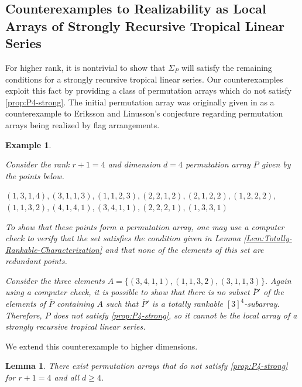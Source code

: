 \documentclass{amsart}
\newtheorem{lemma}[theorem]{Lemma}
\newtheorem{varexample}[theorem]{Example}
\newenvironment{example}{\begin{varexample}
		\begin{normalfont}}{\end{normalfont}
\end{varexample}}
\begin{document}
	\subsection{Counterexamples to Realizability as Local Arrays of Strongly Recursive Tropical Linear Series}
	\label{Subsec:counterexample-to-SRTLS-realizability}
	
	For higher rank, it is nontrivial to show that $\Sigma_P$ will satisfy the remaining conditions for a strongly recursive tropical linear series. Our counterexamples exploit this fact by providing a class of permutation arrays which do not satisfy \ref{prop:P4-strong}. The initial permutation array was originally given in \cite{billey2008intersections} as a counterexample to Eriksson and Linusson's conjecture regarding permutation arrays being realized by flag arrangements.
	
	\begin{example}\cite[Counterexample~3]{billey2008intersections}
		\label{Ex:counterexample-to-realizability}
		Consider the rank $r+1 = 4$ and dimension $d = 4$ permutation array $P$ given by the points below.
		
		\begin{center}
			$(1,3,1,4), (3,1,1,3), (1,1,2,3), (2,2,1,2), (2,1,2,2), (1,2,2,2),$
			$(1,1,3,2), (4,1,4,1), (3,4,1,1), (2,2,2,1), (1,3,3,1)$
		\end{center}
		
		To show that these points form a permutation array, one may use a computer check to verify that the set satisfies the condition given in Lemma \ref{Lem:Totally-Rankable-Characterization} and that none of the elements of this set are redundant points.
		
		Consider the three elements $A = \{ (3, 4, 1, 1), (1, 1, 3, 2), (3, 1, 1, 3) \}$. Again using a computer check, it is possible to show that there is no subset $\overline{P}'$ of the elements of $\overline{P}$ containing $A$ such that $\overline{P}'$ is a totally rankable $[3]^4$-subarray. Therefore, $P$ does not satisfy \ref{prop:P4-strong}, so it cannot be the local array of a strongly recursive tropical linear series.
	\end{example}
	
	We extend this counterexample to higher dimensions.
	
	\begin{lemma}
		There exist permutation arrays that do not satisfy \ref{prop:P4-strong} for $r+1 = 4$ and all $d \geq 4$.
		\label{Lem:counterexample-to-realizability-dimension-induction}
	\end{lemma}
	
\end{document}
